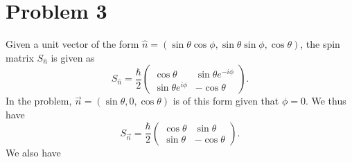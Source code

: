 \documentclass[11pt, letterpaper]{article}
\begin{document}
\section*{Problem 3}
Given a unit vector of the form $\hat{n} =(\sin \theta \cos \phi ,\sin \theta \sin \phi ,\cos \theta )$, the spin matrix $S_{\hat{n} } $ is given as
\[
	S_{\hat{n} } =\frac{\hbar}{2} \begin{pmatrix}
	\cos \theta  & \sin \theta e^{-i\phi }  \\
	\sin \theta e^{i\phi }  & -\cos \theta 
	\end{pmatrix}
.\]
In the problem, $\vec{n} =(\sin \theta ,0,\cos \theta )$ is of this form given that $\phi =0$. We thus have
\[
	S_{\vec{n} } =\frac{\hbar}{2}\begin{pmatrix}
	\cos \theta  & \sin \theta  \\
	\sin \theta  & -\cos \theta 
	\end{pmatrix}
.\]
We also have
\end{document}
